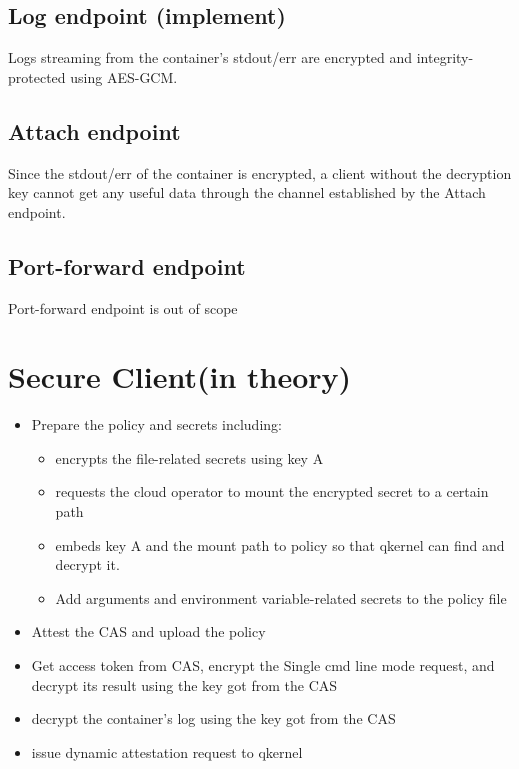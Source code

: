 \subsection{Log endpoint (implement)}
Logs streaming from the container's stdout/err are encrypted and integrity-protected using AES-GCM.
\subsection{Attach endpoint}
Since the stdout/err of the container is encrypted, a client without the decryption key cannot get any useful data through the channel established by the Attach endpoint.

\subsection{Port-forward endpoint}
Port-forward endpoint is out of scope

\section{Secure Client(in theory)}

\begin{itemize}
    \item  Prepare the policy and secrets including:
    \begin{itemize}
        \item  encrypts the file-related secrets using key A
        \item requests the cloud operator to mount the encrypted secret to a certain path
        \item embeds key A  and the mount path to policy so that qkernel can find and decrypt it.
        \item  Add arguments and environment variable-related secrets to the policy file
    \end{itemize}
    \item Attest the CAS and upload the policy
    \item  Get access token from CAS, encrypt the Single cmd line mode request, and decrypt its result using the key got from the CAS
    \item  decrypt the container's log using the key got from the CAS
    \item  issue dynamic attestation request to qkernel
\end{itemize}






\cleardoublepage

